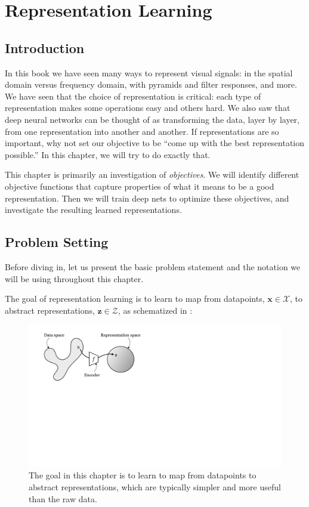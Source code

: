 \chapter{Representation Learning}\label{chapter:representation_learning}

\section{Introduction}
In this book we have seen many ways to represent visual signals: in the spatial domain versus frequency domain, with pyramids and filter responses, and more. We have seen that the choice of representation is critical: each type of representation makes some operations easy and others hard. We also saw that deep neural networks can be thought of as transforming the data, layer by layer, from one representation into another and another.%
If representations are so important, why not set our objective to be ``come up with the best representation possible.'' In this chapter, we will try to do exactly that.

This chapter is primarily an investigation of \textit{objectives}. We will identify different objective functions that capture properties of what it means to be a good representation. Then we will train deep nets to optimize these objectives, and investigate the resulting learned representations.

\section{Problem Setting}
Before diving in, let us present the basic problem statement and the notation we will be using throughout this chapter. 

The goal of representation learning is to learn to map from datapoints, $\mathbf{x} \in \mathcal{X}$, to abstract representations, $\mathbf{z} \in \mathcal{Z}$, as schematized in \fig{\ref{fig:representation_learning:rep_learning_schematic}}:

\begin{figure}[h!]
    \centerline{
        \includegraphics[width=.52\linewidth]{figures/representation_learning/rep_learning_schematic.pdf}
    }
  \caption{The goal in this chapter is to learn to map from datapoints to abstract representations, which are typically simpler and more useful than the raw data.}\label{fig:representation_learning:rep_learning_schematic}
\end{figure}

